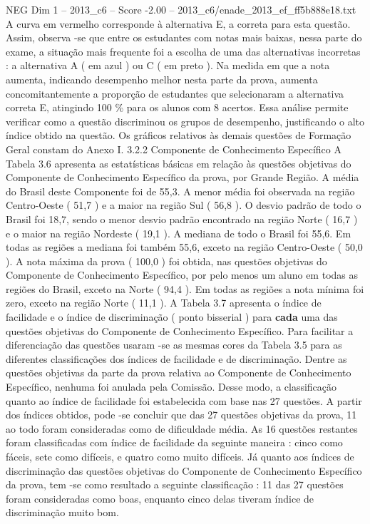 \begin{textsample}{NEG Dim 1 – 2013\_c6 – Score -2.00 – 2013\_c6/enade\_2013\_ef\_ff5b888e18.txt}
A curva em vermelho corresponde à alternativa E, a correta para esta questão.
Assim, observa -se que entre os estudantes com notas mais baixas, nessa parte do exame, a situação mais frequente foi a escolha de uma das alternativas incorretas : a alternativa A ( em azul ) ou C ( em preto ).
Na medida em que a nota aumenta, indicando desempenho melhor nesta parte da prova, aumenta concomitantemente a proporção de estudantes que selecionaram a alternativa correta E, atingindo 100 \% para os alunos com 8 acertos.
Essa análise permite verificar como a questão discriminou os grupos de desempenho, justificando o alto índice obtido na questão.
Os gráficos relativos às demais questões de Formação Geral constam do Anexo I. 3.2.2 Componente de Conhecimento Específico A Tabela 3.6 apresenta as estatísticas básicas em relação às questões objetivas do Componente de Conhecimento Específico da prova, por Grande Região.
A média do Brasil deste Componente foi de 55,3.
A menor média foi observada na região Centro-Oeste ( 51,7 ) e a maior na região Sul ( 56,8 ).
O desvio padrão de todo o Brasil foi 18,7, sendo o menor desvio padrão encontrado na região Norte ( 16,7 ) e o maior na região Nordeste ( 19,1 ).
A mediana de todo o Brasil foi 55,6.
Em todas as regiões a mediana foi também 55,6, exceto na região Centro-Oeste ( 50,0 ).
A nota máxima da prova ( 100,0 ) foi obtida, nas questões objetivas do Componente de Conhecimento Específico, por pelo menos um aluno em todas as regiões do Brasil, exceto na Norte ( 94,4 ).
Em todas as regiões a nota mínima foi zero, exceto na região Norte ( 11,1 ).
A Tabela 3.7 apresenta o índice de facilidade e o índice de discriminação ( ponto bisserial ) para \textbf{cada} uma das questões objetivas do Componente de Conhecimento Específico.
Para facilitar a diferenciação das questões usaram -se as mesmas cores da Tabela 3.5 para as diferentes classificações dos índices de facilidade e de discriminação.
Dentre as questões objetivas da parte da prova relativa ao Componente de Conhecimento Específico, nenhuma foi anulada pela Comissão.
Desse modo, a classificação quanto ao índice de facilidade foi estabelecida com base nas 27 questões.
A partir dos índices obtidos, pode -se concluir que das 27 questões objetivas da prova, 11 ao todo foram consideradas como de dificuldade média.
As 16 questões restantes foram classificadas com índice de facilidade da seguinte maneira : cinco como fáceis, sete como difíceis, e quatro como muito difíceis.
Já quanto aos índices de discriminação das questões objetivas do Componente de Conhecimento Específico da prova, tem -se como resultado a seguinte classificação : 11 das 27 questões foram consideradas como boas, enquanto cinco delas tiveram índice de discriminação muito bom.

\end{textsample}
